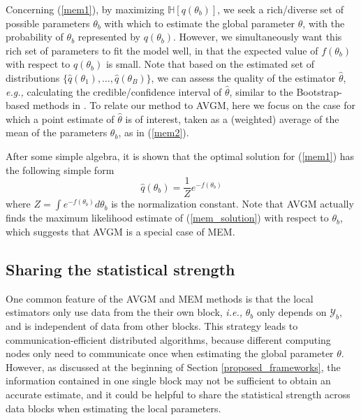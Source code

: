 \documentclass{article}
\newcommand{\ie}[0]{\emph{i.e., }}
\newcommand{\eg}[0]{\emph{e.g., }}
\newcommand{\1}[0]{\ensuremath{\boldsymbol{1}}\xspace}
\begin{document}
Concerning (\ref{mem1}), by maximizing $\mathbb{H}[q(\theta_b)]$, we seek a rich/diverse set of possible parameters $\theta_b$ with which to estimate the global parameter $\theta$, with the probability of $\theta_b$ represented by $q(\theta_b)$. However, we simultaneously want this rich set of parameters to fit the model well, in that the expected value of $f(\theta_b)$ with respect to $q(\theta_b)$ is small. Note that based on the estimated set of distributions $\{\hat q(\theta_1), \ldots, \hat q(\theta_B)\}$, we can assess the quality of the estimator $\hat\theta$, \eg calculating the credible/confidence interval of $\hat\theta$, similar to the Bootstrap-based methods in \cite{Kleiner2012}. To relate our method to AVGM, here we focus on the case for which a point estimate of $\hat\theta$ is of interest, taken as a (weighted) average of the mean of the parameters $\theta_b$, as in (\ref{mem2}).

After some simple algebra, it is shown that the optimal solution for (\ref{mem1}) has the following simple form
\begin{equation}\label{mem_solution}
\textstyle \hat q(\theta_b) = \frac{1}{Z}e^{-f(\theta_b)}
\end{equation}
where $Z = \int e^{-f(\theta_b)} d\theta_b$ is the normalization constant. Note that AVGM actually finds the maximum likelihood estimate of (\ref{mem_solution}) with respect to $\theta_b$, which suggests that AVGM is a special case of MEM.


\subsection{Sharing the statistical strength}\label{HM}

One common feature of the AVGM and MEM methods is that the local estimators only use data from the their own block, \ie $\theta_b$ only depends on $\mathcal{Y}_b$, and is independent of data from other blocks. This strategy leads to communication-efficient distributed algorithms, because different computing nodes only need to communicate once when estimating the global parameter $\theta$. However, as discussed at the beginning of Section \ref{proposed_frameworks}, the information contained in one single block may not be sufficient to obtain an accurate estimate, and it could be helpful to share the statistical strength across data blocks when estimating the local parameters.
\end{document}
